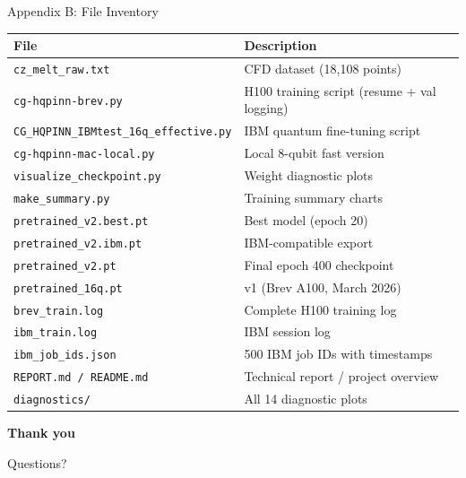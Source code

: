\documentclass[aspectratio=169]{beamer}
\begin{document}
\begin{frame}{Appendix B: File Inventory}
\scriptsize
\begin{tabular}{ll}
\toprule
File & Description \\
\midrule
\texttt{cz\_melt\_raw.txt} & CFD dataset (18,108 points) \\
\texttt{cg-hqpinn-brev.py} & H100 training script (resume + val logging) \\
\texttt{CG\_HQPINN\_IBMtest\_16q\_effective.py} & IBM quantum fine-tuning script \\
\texttt{cg-hqpinn-mac-local.py} & Local 8-qubit fast version \\
\texttt{visualize\_checkpoint.py} & Weight diagnostic plots \\
\texttt{make\_summary.py} & Training summary charts \\
\texttt{pretrained\_v2.best.pt} & Best model (epoch 20) \\
\texttt{pretrained\_v2.ibm.pt} & IBM-compatible export \\
\texttt{pretrained\_v2.pt} & Final epoch 400 checkpoint \\
\texttt{pretrained\_16q.pt} & v1 (Brev A100, March 2026) \\
\texttt{brev\_train.log} & Complete H100 training log \\
\texttt{ibm\_train.log} & IBM session log \\
\texttt{ibm\_job\_ids.json} & 500 IBM job IDs with timestamps \\
\texttt{REPORT.md / README.md} & Technical report / project overview \\
\texttt{diagnostics/} & All 14 diagnostic plots \\
\bottomrule
\end{tabular}
\end{frame}

\begin{frame}
\centering
\Large \textbf{Thank you}

\vspace{0.5cm}
\normalsize
Questions?
\end{frame}
\end{document}
